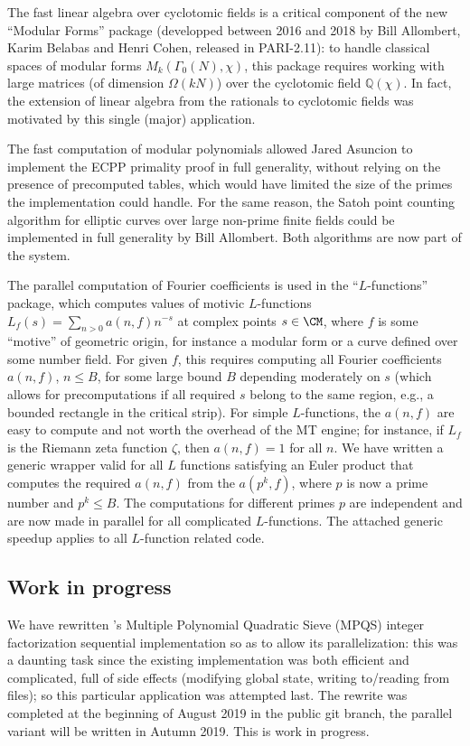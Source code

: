 \documentclass{deliverablereport}
\begin{document}
The fast linear algebra over cyclotomic fields is a critical component of the
new ``Modular Forms'' package (developped between 2016 and 2018 by Bill
Allombert, Karim Belabas and Henri Cohen, released in PARI-2.11): to handle
classical spaces of modular forms $M_k(\Gamma_0(N), \chi)$, this package
requires working with large matrices (of dimension $\Omega(kN)$) over the
cyclotomic field $\mathbb{Q}(\chi)$. In fact, the extension of linear algebra
from the rationals to cyclotomic fields was motivated by this single (major)
application.

The fast computation of modular polynomials allowed Jared Asuncion to
implement the ECPP primality proof in full generality, without relying on the
presence of precomputed tables, which would have limited the size of the
primes the implementation could handle. For the same reason, the Satoh point
counting algorithm for elliptic curves over large non-prime finite fields
could be implemented in full generality by Bill Allombert. Both algorithms
are now part of the \PariGP system.

The parallel computation of Fourier coefficients is used
in the ``$L$-functions'' package, which computes values of motivic
$L$-functions $L_f(s) = \sum_{n>0} a(n,f) n^{-s}$ at complex points $s\in
\CM$, where $f$ is some ``motive'' of geometric origin, for instance a
modular form or a curve defined over some number field. For given $f$, this
requires computing all Fourier coefficients $a(n,f)$, $n \leq B$, for
some large bound $B$ depending moderately on $s$ (which allows for
precomputations if all required $s$ belong to the same region, e.g., a
bounded rectangle in the critical strip). For simple $L$-functions, the
$a(n,f)$ are easy to compute and not worth the overhead of the MT engine; for
instance, if $L_f$ is the Riemann zeta function $\zeta$, then $a(n,f) = 1$
for all $n$. We have written a generic wrapper valid for all $L$ functions
satisfying an Euler product that computes the required $a(n,f)$ from the
$a(p^k,f)$, where $p$ is now a prime number and $p^k\leq B$. The computations
for different primes $p$ are independent and are now made in parallel for all
complicated $L$-functions. The attached generic speedup applies to all
$L$-function related code.

\subsection{Work in progress}

We have rewritten \Pari's Multiple Polynomial Quadratic Sieve (MPQS) integer
factorization sequential implementation so as to allow its parallelization:
this was a daunting task since the existing implementation was both efficient
and complicated, full of side effects (modifying global state, writing
to/reading from files); so this particular application was attempted last.
The rewrite was completed at the beginning of August 2019 in the public
 git branch, the parallel variant will be written in Autumn 2019.
This is work in progress.
\end{document}
